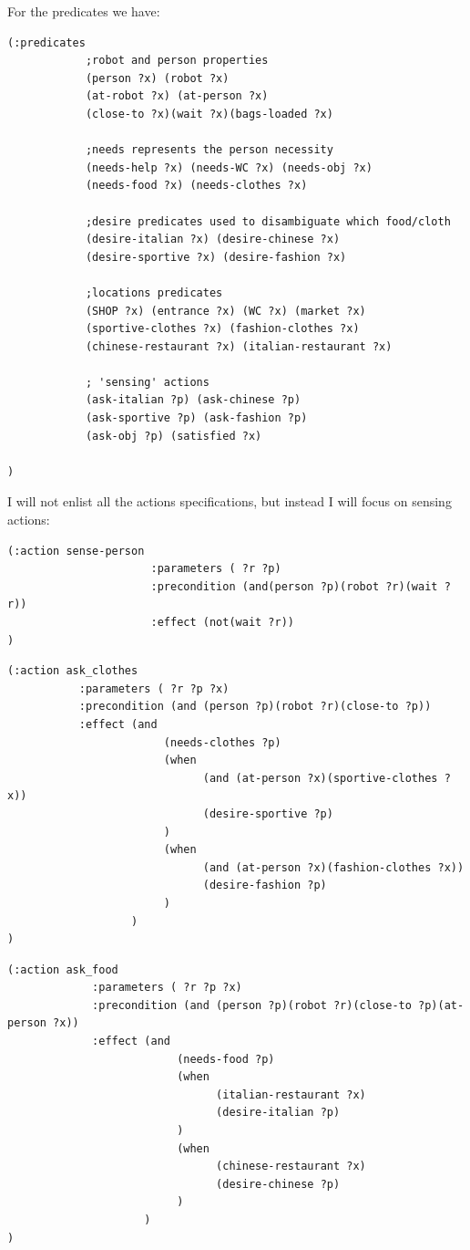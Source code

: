 \documentclass[pdftex,12pt,a4paper]{report}
\begin{document}
\noindent For the predicates we have:
\begin{verbatim}
(:predicates
            ;robot and person properties
            (person ?x) (robot ?x)
            (at-robot ?x) (at-person ?x)
            (close-to ?x)(wait ?x)(bags-loaded ?x)

            ;needs represents the person necessity
            (needs-help ?x) (needs-WC ?x) (needs-obj ?x)
            (needs-food ?x) (needs-clothes ?x)

            ;desire predicates used to disambiguate which food/cloth
            (desire-italian ?x) (desire-chinese ?x)
            (desire-sportive ?x) (desire-fashion ?x)

            ;locations predicates
            (SHOP ?x) (entrance ?x) (WC ?x) (market ?x)
            (sportive-clothes ?x) (fashion-clothes ?x)
            (chinese-restaurant ?x) (italian-restaurant ?x)

            ; 'sensing' actions
            (ask-italian ?p) (ask-chinese ?p)
            (ask-sportive ?p) (ask-fashion ?p)
            (ask-obj ?p) (satisfied ?x)

)
\end{verbatim}

\noindent I will not enlist all the actions specifications, but instead I will focus on sensing actions:
\begin{verbatim}
(:action sense-person
                      :parameters ( ?r ?p)
                      :precondition (and(person ?p)(robot ?r)(wait ?r))
                      :effect (not(wait ?r))
)
\end{verbatim}

\begin{verbatim}
(:action ask_clothes
           :parameters ( ?r ?p ?x)
           :precondition (and (person ?p)(robot ?r)(close-to ?p))
           :effect (and
                        (needs-clothes ?p)
                        (when
                              (and (at-person ?x)(sportive-clothes ?x))
                              (desire-sportive ?p)
                        )
                        (when
                              (and (at-person ?x)(fashion-clothes ?x))
                              (desire-fashion ?p)
                        )
                   )
)
\end{verbatim}

\begin{verbatim}
(:action ask_food
             :parameters ( ?r ?p ?x)
             :precondition (and (person ?p)(robot ?r)(close-to ?p)(at-person ?x))
             :effect (and
                          (needs-food ?p)
                          (when
                                (italian-restaurant ?x)
                                (desire-italian ?p)
                          )
                          (when
                                (chinese-restaurant ?x)
                                (desire-chinese ?p)
                          )
                     )
)
\end{verbatim}
\end{document}
